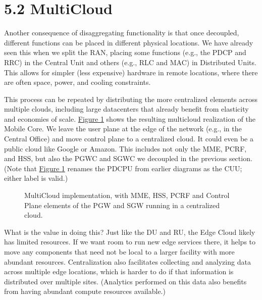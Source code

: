 \documentclass[a4paper,11pt,english]{sphinxmanual}
\let\sphinxpxdimen\pdfpxdimen\else\newdimen\sphinxpxdimen
\begin{document}
\section{5.2 Multi\sphinxhyphen{}Cloud}
\label{\detokenize{disaggregate:multi-cloud}}
\sphinxAtStartPar
Another consequence of disaggregating functionality is that once
decoupled, different functions can be placed in different physical
locations. We have already seen this when we split the RAN, placing some
functions (e.g., the PDCP and RRC) in the Central Unit and others (e.g.,
RLC and MAC) in Distributed Units. This allows for simpler (less
expensive) hardware in remote locations, where there are often space,
power, and cooling constraints.

\sphinxAtStartPar
This process can be repeated by distributing the more centralized
elements across multiple clouds, including large datacenters that
already benefit from elasticity and economies of
scale. \hyperref[\detokenize{disaggregate:fig-multicloud}]{Figure \ref{\detokenize{disaggregate:fig-multicloud}}} shows the resulting
multi\sphinxhyphen{}cloud realization of the Mobile Core. We leave the user plane at
the edge of the network (e.g., in the Central Office) and move control
plane to a centralized cloud. It could even be a public cloud like
Google or Amazon. This includes not only the MME, PCRF, and HSS, but
also the PGW\sphinxhyphen{}C and SGW\sphinxhyphen{}C we decoupled in the previous section. (Note
that \hyperref[\detokenize{disaggregate:fig-multicloud}]{Figure \ref{\detokenize{disaggregate:fig-multicloud}}} renames the PDCP\sphinxhyphen{}U from
earlier diagrams as the CU\sphinxhyphen{}U; either label is valid.)

\begin{figure}[ht]
\centering
\capstart

\noindent\sphinxincludegraphics[width=600\sphinxpxdimen]{{Slide24}.png}
\caption{Multi\sphinxhyphen{}Cloud implementation, with MME, HSS, PCRF and
Control Plane elements of the PGW and SGW running in a centralized
cloud.}\label{\detokenize{disaggregate:id4}}\label{\detokenize{disaggregate:fig-multicloud}}\end{figure}

\sphinxAtStartPar
What is the value in doing this? Just like the DU and RU, the Edge Cloud
likely has limited resources. If we want room to run new edge services
there, it helps to move any components that need not be local to a
larger facility with more abundant resources. Centralization also
facilitates collecting and analyzing data across multiple edge
locations, which is harder to do if that information is distributed over
multiple sites. (Analytics performed on this data also benefits from
having abundant compute resources available.)
\end{document}
